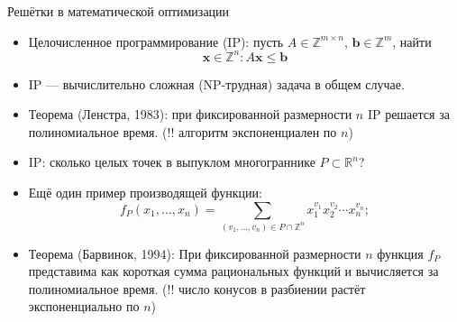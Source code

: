 \documentclass[serif, aspectratio=169]{beamer}
\begin{document}
\begin{frame}{Решётки в математической оптимизации}
    \begin{itemize}
        \item Целочисленное программирование (IP): пусть $A\in\mathbb{Z}^{m\times n}$, $\mathbf{b}\in\mathbb{Z}^m$, найти
        \[\mathbf{x}\in\mathbb{Z}^n : A\mathbf{x}\le \mathbf{b}\]
        \item IP --- вычислительно сложная (NP-трудная) задача в общем случае.
        \item Теорема (Ленстра, 1983): при фиксированной размерности $n$ IP решается за полиномиальное время. (!! алгоритм экспоненциален по $n$)
        \item IP: сколько целых точек в выпуклом многограннике $P\subset\mathbb{R}^n$?
        \item Ещё один пример производящей функции:
            \[f_P(x_1,\dots,x_n) = \sum_{(v_1,\dots,v_n)\in P\cap\mathbb{Z}^n} x_1^{v_1}x_2^{v_2}\cdots x_n^{v_n};\]
        \item Теорема (Барвинок, 1994): При фиксированной размерности $n$ функция $f_P$ представима как короткая сумма рациональных функций и вычисляется за полиномиальное время. (!! число конусов в разбиении растёт экспоненциально по $n$)
    \end{itemize}
\end{frame}
\end{document}
